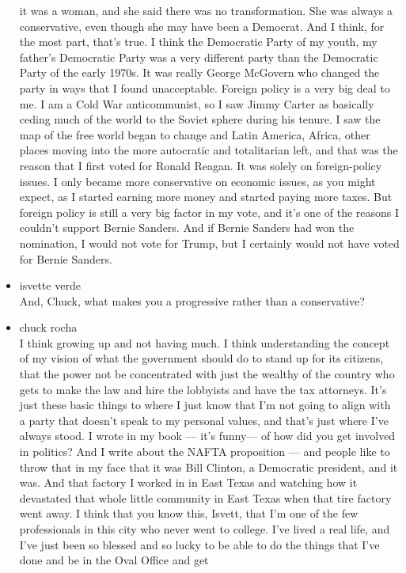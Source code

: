 \begin{itemize}
  it was a woman, and she said there was no transformation. She was
  always a conservative, even though she may have been a Democrat. And I
  think, for the most part, that's true. I think the Democratic Party of
  my youth, my father's Democratic Party was a very different party than
  the Democratic Party of the early 1970s. It was really George McGovern
  who changed the party in ways that I found unacceptable. Foreign
  policy is a very big deal to me. I am a Cold War anticommunist, so I
  saw Jimmy Carter as basically ceding much of the world to the Soviet
  sphere during his tenure. I saw the map of the free world began to
  change and Latin America, Africa, other places moving into the more
  autocratic and totalitarian left, and that was the reason that I first
  voted for Ronald Reagan. It was solely on foreign-policy issues. I
  only became more conservative on economic issues, as you might expect,
  as I started earning more money and started paying more taxes. But
  foreign policy is still a very big factor in my vote, and it's one of
  the reasons I couldn't support Bernie Sanders. And if Bernie Sanders
  had won the nomination, I would not vote for Trump, but I certainly
  would not have voted for Bernie Sanders.
\item
  isvette verde\\
  And, Chuck, what makes you a progressive rather than a conservative?
\item
  chuck rocha\\
  I think growing up and not having much. I think understanding the
  concept of my vision of what the government should do to stand up for
  its citizens, that the power not be concentrated with just the wealthy
  of the country who gets to make the law and hire the lobbyists and
  have the tax attorneys. It's just these basic things to where I just
  know that I'm not going to align with a party that doesn't speak to my
  personal values, and that's just where I've always stood. I wrote in
  my book --- it's funny--- of how did you get involved in politics? And
  I write about the NAFTA proposition --- and people like to throw that
  in my face that it was Bill Clinton, a Democratic president, and it
  was. And that factory I worked in in East Texas and watching how it
  devastated that whole little community in East Texas when that tire
  factory went away. I think that you know this, Isvett, that I'm one of
  the few professionals in this city who never went to college. I've
  lived a real life, and I've just been so blessed and so lucky to be
  able to do the things that I've done and be in the Oval Office and get

\end{itemize}
